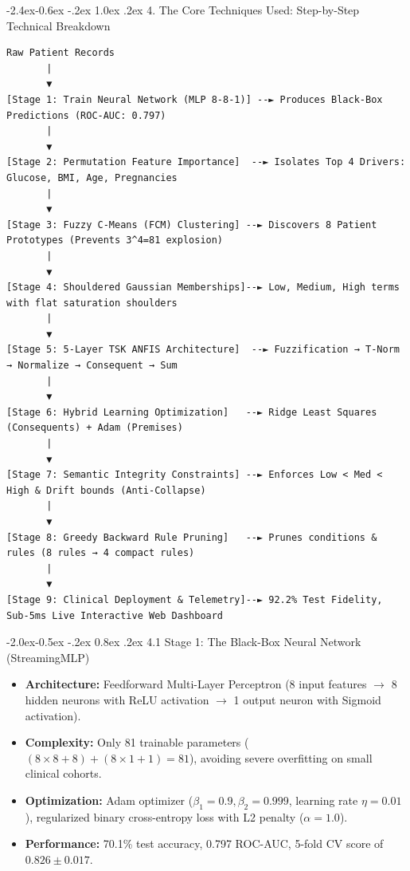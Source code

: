 \documentclass[10pt,a4paper]{article}
\makeatletter
\renewcommand\subsection{\@startsection{subsection}{2}{\z@}%
                                     {-2.4ex\@plus -0.6ex \@minus -.2ex}%
                                     {1.0ex \@plus .2ex}%
                                     {\normalfont\large\bfseries\color{primary}}}
\renewcommand\subsubsection{\@startsection{subsubsection}{3}{\z@}%
                                     {-2.0ex\@plus -0.5ex \@minus -.2ex}%
                                     {0.8ex \@plus .2ex}%
                                     {\normalfont\normalsize\bfseries\color{accent}}}
\providecommand{\tightlist}{\setlength{\itemsep}{1pt}\setlength{\parskip}{1pt}}
\makeatother
\begin{document}
\subsection{4. The Core Techniques Used: Step-by-Step Technical
Breakdown}\label{the-core-techniques-used-step-by-step-technical-breakdown}

\begin{verbatim}
Raw Patient Records
       |
       ▼
[Stage 1: Train Neural Network (MLP 8-8-1)] --► Produces Black-Box Predictions (ROC-AUC: 0.797)
       |
       ▼
[Stage 2: Permutation Feature Importance]  --► Isolates Top 4 Drivers: Glucose, BMI, Age, Pregnancies
       |
       ▼
[Stage 3: Fuzzy C-Means (FCM) Clustering] --► Discovers 8 Patient Prototypes (Prevents 3^4=81 explosion)
       |
       ▼
[Stage 4: Shouldered Gaussian Memberships]--► Low, Medium, High terms with flat saturation shoulders
       |
       ▼
[Stage 5: 5-Layer TSK ANFIS Architecture]  --► Fuzzification → T-Norm → Normalize → Consequent → Sum
       |
       ▼
[Stage 6: Hybrid Learning Optimization]   --► Ridge Least Squares (Consequents) + Adam (Premises)
       |
       ▼
[Stage 7: Semantic Integrity Constraints] --► Enforces Low < Med < High & Drift bounds (Anti-Collapse)
       |
       ▼
[Stage 8: Greedy Backward Rule Pruning]   --► Prunes conditions & rules (8 rules → 4 compact rules)
       |
       ▼
[Stage 9: Clinical Deployment & Telemetry]--► 92.2% Test Fidelity, Sub-5ms Live Interactive Web Dashboard
\end{verbatim}

\subsubsection{4.1 Stage 1: The Black-Box Neural Network
(StreamingMLP)}\label{stage-1-the-black-box-neural-network-streamingmlp}

\begin{itemize}
\tightlist
\item
  \textbf{Architecture:} Feedforward Multi-Layer Perceptron (8 input
  features \(\to\) 8 hidden neurons with ReLU activation \(\to\) 1
  output neuron with Sigmoid activation).
\item
  \textbf{Complexity:} Only 81 trainable parameters
  (\((8 \times 8 + 8) + (8 \times 1 + 1) = 81\)), avoiding severe
  overfitting on small clinical cohorts.
\item
  \textbf{Optimization:} Adam optimizer (\(\beta_1=0.9, \beta_2=0.999\),
  learning rate \(\eta=0.01\)), regularized binary cross-entropy loss
  with L2 penalty (\(\alpha=1.0\)).
\item
  \textbf{Performance:} 70.1\% test accuracy, 0.797 ROC-AUC, 5-fold CV
  score of \(0.826 \pm 0.017\).
\end{itemize}
\end{document}
